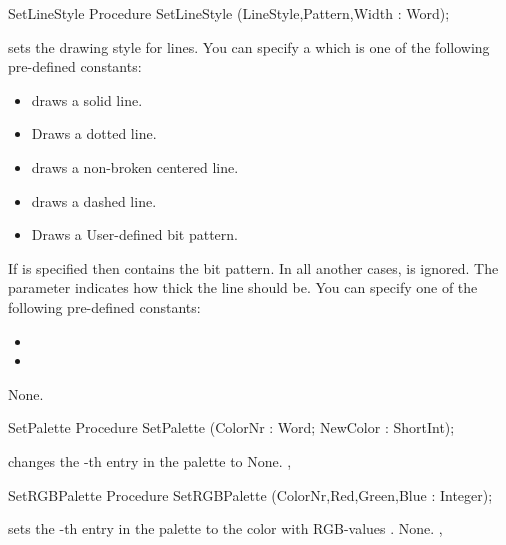 \begin{procedure}{SetLineStyle}
\Declaration
Procedure SetLineStyle (LineStyle,Pattern,Width :
Word);

\Description
{}
sets the drawing style for lines. You can specify a  which is
one of the following pre-defined constants:

\begin{itemize}
\item {} draws a solid line.
\item {} Draws a dotted line.
\item {} draws a non-broken centered line.
\item {} draws a dashed line.
\item {} Draws a User-defined bit pattern.
\end{itemize}
If  is specified then  contains the bit pattern.
In all another cases,  is ignored. The parameter  
indicates how thick the line should be. You can specify one of the following
pre-defined constants:

\begin{itemize}
\item {}
\item {}
\end{itemize}

\Errors
None.
\SeeAlso
{}
\end{procedure}

\begin{procedure}{SetPalette}
\Declaration
Procedure SetPalette (ColorNr : Word; NewColor : ShortInt);

\Description
{} changes the -th entry in the palette to
\Errors
None.
\SeeAlso
{},
\end{procedure}

\begin{procedure}{SetRGBPalette}
\Declaration
Procedure SetRGBPalette (ColorNr,Red,Green,Blue : Integer);

\Description
{} sets the -th entry in the palette to the
color with RGB-values .
\Errors
None.
\SeeAlso
{},
\end{procedure}

